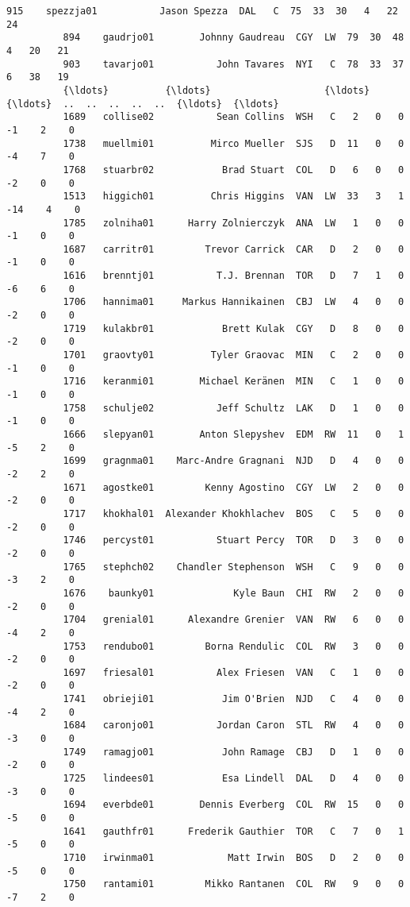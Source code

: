 \documentclass[11pt]{article}
\begin{document}
\begin{Verbatim}[commandchars=\\\{\}]
          915    spezzja01           Jason Spezza  DAL   C  75  33  30   4   22   24   
          894    gaudrjo01        Johnny Gaudreau  CGY  LW  79  30  48   4   20   21   
          903    tavarjo01           John Tavares  NYI   C  78  33  37   6   38   19   
          {\ldots}          {\ldots}                    {\ldots}  {\ldots}  ..  ..  ..  ..  ..  {\ldots}  {\ldots}   
          1689   collise02           Sean Collins  WSH   C   2   0   0  -1    2    0   
          1738   muellmi01          Mirco Mueller  SJS   D  11   0   0  -4    7    0   
          1768   stuarbr02            Brad Stuart  COL   D   6   0   0  -2    0    0   
          1513   higgich01          Chris Higgins  VAN  LW  33   3   1 -14    4    0   
          1785   zolniha01      Harry Zolnierczyk  ANA  LW   1   0   0  -1    0    0   
          1687   carritr01         Trevor Carrick  CAR   D   2   0   0  -1    0    0   
          1616   brenntj01           T.J. Brennan  TOR   D   7   1   0  -6    6    0   
          1706   hannima01     Markus Hannikainen  CBJ  LW   4   0   0  -2    0    0   
          1719   kulakbr01            Brett Kulak  CGY   D   8   0   0  -2    0    0   
          1701   graovty01          Tyler Graovac  MIN   C   2   0   0  -1    0    0   
          1716   keranmi01        Michael Keränen  MIN   C   1   0   0  -1    0    0   
          1758   schulje02           Jeff Schultz  LAK   D   1   0   0  -1    0    0   
          1666   slepyan01        Anton Slepyshev  EDM  RW  11   0   1  -5    2    0   
          1699   gragnma01    Marc-Andre Gragnani  NJD   D   4   0   0  -2    2    0   
          1671   agostke01         Kenny Agostino  CGY  LW   2   0   0  -2    0    0   
          1717   khokhal01  Alexander Khokhlachev  BOS   C   5   0   0  -2    0    0   
          1746   percyst01           Stuart Percy  TOR   D   3   0   0  -2    0    0   
          1765   stephch02    Chandler Stephenson  WSH   C   9   0   0  -3    2    0   
          1676    baunky01              Kyle Baun  CHI  RW   2   0   0  -2    0    0   
          1704   grenial01      Alexandre Grenier  VAN  RW   6   0   0  -4    2    0   
          1753   rendubo01         Borna Rendulic  COL  RW   3   0   0  -2    0    0   
          1697   friesal01           Alex Friesen  VAN   C   1   0   0  -2    0    0   
          1741   obrieji01            Jim O'Brien  NJD   C   4   0   0  -4    2    0   
          1684   caronjo01           Jordan Caron  STL  RW   4   0   0  -3    0    0   
          1749   ramagjo01            John Ramage  CBJ   D   1   0   0  -2    0    0   
          1725   lindees01            Esa Lindell  DAL   D   4   0   0  -3    0    0   
          1694   everbde01        Dennis Everberg  COL  RW  15   0   0  -5    0    0   
          1641   gauthfr01      Frederik Gauthier  TOR   C   7   0   1  -5    0    0   
          1710   irwinma01             Matt Irwin  BOS   D   2   0   0  -5    0    0   
          1750   rantami01         Mikko Rantanen  COL  RW   9   0   0  -7    2    0   
          

\end{Verbatim}
\end{document}
